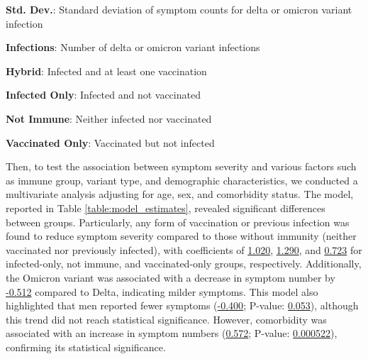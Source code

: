 \documentclass[11pt]{article}
\begin{document}
\begin{table}[h]
\begin{threeparttable}
\begin{tablenotes}
\item \textbf{Std. Dev.}: Standard deviation of symptom counts for delta or omicron variant infection
\item \textbf{Infections}: Number of delta or omicron variant infections
\item \textbf{Hybrid}: Infected and at least one vaccination
\item \textbf{Infected Only}: Infected and not vaccinated
\item \textbf{Not Immune}: Neither infected nor vaccinated
\item \textbf{Vaccinated Only}: Vaccinated but not infected
\end{tablenotes}
\end{threeparttable}
\end{table}

Then, to test the association between symptom severity and various factors such as immune group, variant type, and demographic characteristics, we conducted a multivariate analysis adjusting for age, sex, and comorbidity status. The model, reported in Table \ref{table:model_estimates}, revealed significant differences between groups. Particularly, any form of vaccination or previous infection was found to reduce symptom severity compared to those without immunity (neither vaccinated nor previously infected), with coefficients of \hyperlink{B1a}{1.020}, \hyperlink{B2a}{1.290}, and \hyperlink{B3a}{0.723} for infected-only, not immune, and vaccinated-only groups, respectively. Additionally, the Omicron variant was associated with a decrease in symptom number by \hyperlink{B4a}{-0.512} compared to Delta, indicating milder symptoms. This model also highlighted that men reported fewer symptoms (\hyperlink{B5a}{-0.400}; P-value: \hyperlink{B5b}{0.053}), although this trend did not reach statistical significance. However, comorbidity was associated with an increase in symptom numbers (\hyperlink{B7a}{0.572}; P-value: \hyperlink{B7b}{0.000522}), confirming its statistical significance.
\end{document}
